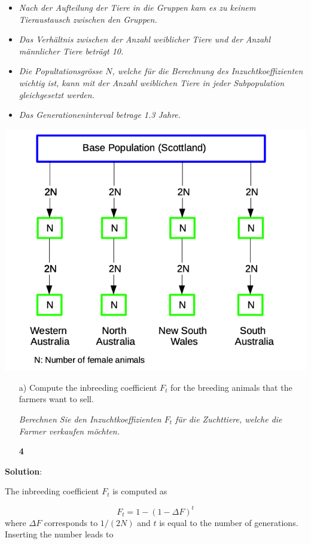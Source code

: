 \documentclass[
]{article}
\providecommand{\tightlist}{%
  \setlength{\itemsep}{0pt}\setlength{\parskip}{0pt}}
\newcommand{\points}[1]
{\begin{flushright}\textbf{#1}\end{flushright}}
\newcommand{\solstart}
{\vspace{3ex}\textbf{Solution}:}
\begin{document}
\begin{itemize}
\tightlist
\item
  \textit{Nach der Aufteilung der Tiere in die Gruppen kam es zu keinem Tieraustausch zwischen den Gruppen.}
\item
  \textit{Das Verhältnis zwischen der Anzahl weiblicher Tiere und der Anzahl männlicher Tiere beträgt 10.}
\item
  \textit{Die Popultationsgrösse $N$, welche für die Berechnung des Inzuchtkoeffizienten wichtig ist, kann mit der Anzahl weiblichen Tiere in jeder Subpopulation gleichgesetzt werden.}
\item
  \textit{Das Generationeninterval betrage 1.3 Jahre.}
\end{itemize}

\includegraphics{odg/fig-sub-pop.png}

\vspace{3ex}

\begin{enumerate}
\item[a)] Compute the inbreeding coefficient $F_t$ for the breeding animals that the farmers want to sell. 

\textit{Berechnen Sie den Inzuchtkoeffizienten $F_t$ für die Zuchttiere, welche die Farmer verkaufen möchten.}
\points{4}
\end{enumerate}

\solstart

The inbreeding coefficient \(F_t\) is computed as

\[F_t = 1 - (1 - \Delta F)^t\] where \(\Delta F\) corresponds to
\(1/(2N)\) and \(t\) is equal to the number of generations. Inserting
the number leads to
\end{document}
